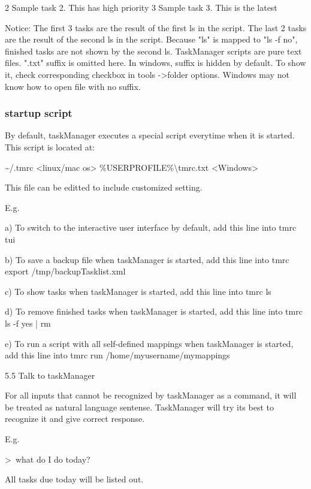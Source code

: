 \documentclass[12pt, a4paper]{article}
\begin{document}
    2   Sample task 2. This has high priority
    3   Sample task 3. This is the latest

Notice: The first 3 tasks are the result of the first ls in the script.
        The last 2 tasks are the result of the second ls in the script.
        Because "ls" is mapped to "ls -f no", finished tasks are not shown by the second ls.
        TaskManager scripts are pure text files. ".txt" suffix is omitted here.
        In windows, suffix is hidden by default. To show it, check corresponding checkbox in tools -\textgreater folder options. 
        Windows may not know how to open file with no suffix.

\subsubsection{startup script}

By default, taskManager executes a special script everytime when it is started. 
This script is located at:

    \~{}/.tmrc                 \textless linux/mac os\textgreater
    \%USERPROFILE\%\textbackslash tmrc.txt  \textless Windows\textgreater

This file can be editted to include customized setting.

E.g.

    a) To switch to the interactive user interface by default, add this line into tmrc
    tui

    b) To save a backup file when taskManager is started, add this line into tmrc
    export /tmp/backupTasklist.xml

    c) To show tasks when taskManager is started, add this line into tmrc
    ls

    d) To remove finished tasks when taskManager is started, add this line into tmrc
    ls -f yes | rm

    e) To run a script with all self-defined mappings when taskManager is started, add this line into tmrc
    run /home/myusername/mymappings

5.5 Talk to taskManager

For all inputs that cannot be recognized by taskManager as a command, it will be treated as natural language sentense. 
TaskManager will try its best to recognize it and give correct response.

E.g.

    \textgreater \ what do I do today?

All tasks due today will be listed out.    
\end{document}

